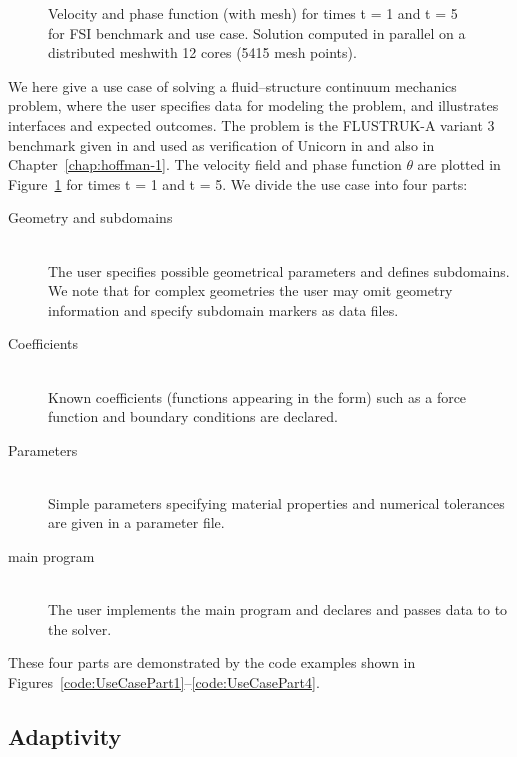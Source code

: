 \begin{figure}
  \caption{Velocity and phase function (with mesh) for times t = 1 and t = 5 for FSI benchmark and use case. Solution computed in parallel on a distributed meshwith 12 cores (5415 mesh points).}
  \label{fig:fsi2D_plot2}
\end{figure}

We here give a use case of solving a fluid--structure continuum
mechanics problem, where the user specifies data for modeling the
problem, and illustrates interfaces and expected outcomes. The problem
is the FLUSTRUK-A variant 3 benchmark given in \citep{HronTurek2005}
and used as verification of Unicorn
in \citep{HoffmanJanssonStockli2011} and also in
Chapter~\ref{chap:hoffman-1}. The velocity field and phase function
$\theta$ are plotted in Figure~\ref{fig:fsi2D_plot2} for times t = 1
and t = 5. We divide the use case into four parts:

\begin{description}
\item[Geometry and subdomains] \ \\ The user specifies possible
  geometrical parameters and defines subdomains. We note that for
  complex geometries the user may omit geometry information and
  specify subdomain markers as data files.
\item[Coefficients] \ \\ Known coefficients (functions appearing in the form)
  such as a force function and boundary conditions are declared.
\item[Parameters] \ \\ Simple parameters specifying material properties and numerical tolerances are given
in a parameter file.
\item[main program] \ \\ The user implements the main program and
  declares and passes data to to the solver.
\end{description}
These four parts are demonstrated by the code examples shown in
Figures~\ref{code:UseCasePart1}--\ref{code:UseCasePart4}.

\subsection{Adaptivity}

